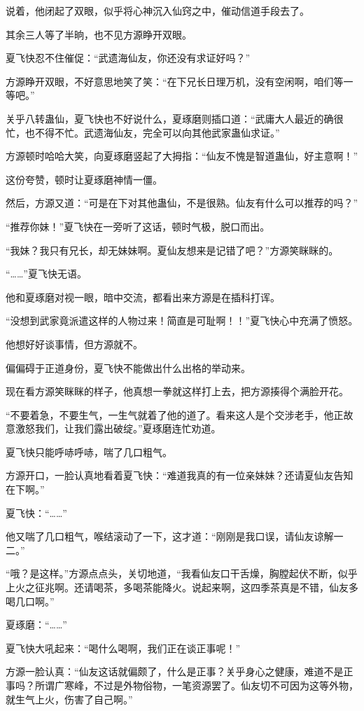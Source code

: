 \begin{this_body}
说着，他闭起了双眼，似乎将心神沉入仙窍之中，催动信道手段去了。

其余三人等了半晌，也不见方源睁开双眼。

夏飞快忍不住催促：“武遗海仙友，你还没有求证好吗？”

方源睁开双眼，不好意思地笑了笑：“在下兄长日理万机，没有空闲啊，咱们等一等吧。”

关乎八转蛊仙，夏飞快也不好说什么，夏琢磨则插口道：“武庸大人最近的确很忙，也不得不忙。武遗海仙友，完全可以向其他武家蛊仙求证。”

方源顿时哈哈大笑，向夏琢磨竖起了大拇指：“仙友不愧是智道蛊仙，好主意啊！”

这份夸赞，顿时让夏琢磨神情一僵。

然后，方源又道：“可是在下对其他蛊仙，不是很熟。仙友有什么可以推荐的吗？”

“推荐你妹！”夏飞快在一旁听了这话，顿时气极，脱口而出。

“我妹？我只有兄长，却无妹妹啊。夏仙友想来是记错了吧？”方源笑眯眯的。

“……”夏飞快无语。

他和夏琢磨对视一眼，暗中交流，都看出来方源是在插科打诨。

“没想到武家竟派遣这样的人物过来！简直是可耻啊！！”夏飞快心中充满了愤怒。

他想好好谈事情，但方源就不。

偏偏碍于正道身份，夏飞快不能做出什么出格的举动来。

现在看方源笑眯眯的样子，他真想一拳就这样打上去，把方源揍得个满脸开花。

“不要着急，不要生气，一生气就着了他的道了。看来这人是个交涉老手，他正故意激怒我们，让我们露出破绽。”夏琢磨连忙劝道。

夏飞快只能呼哧呼哧，喘了几口粗气。

方源开口，一脸认真地看着夏飞快：“难道我真的有一位亲妹妹？还请夏仙友告知在下啊。”

夏飞快：“……”

他又喘了几口粗气，喉结滚动了一下，这才道：“刚刚是我口误，请仙友谅解一二。”

“哦？是这样。”方源点点头，关切地道，“我看仙友口干舌燥，胸膛起伏不断，似乎上火之征兆啊。还请喝茶，多喝茶能降火。说起来啊，这四季茶真是不错，仙友多喝几口啊。”

夏琢磨：“……”

夏飞快大吼起来：“喝什么喝啊，我们正在谈正事呢！”

方源一脸认真：“仙友这话就偏颇了，什么是正事？关乎身心之健康，难道不是正事吗？所谓广寒峰，不过是外物俗物，一笔资源罢了。仙友切不可因为这等外物，就生气上火，伤害了自己啊。”


\end{this_body}
